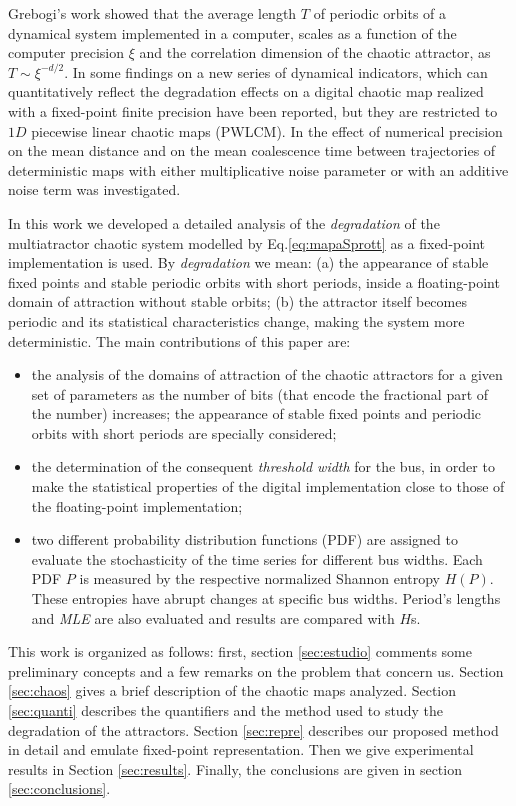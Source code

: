 Grebogi's work \cite{Grebogi1988} showed that the average
length $T$  of periodic orbits of a dynamical system implemented in a computer, scales as a
function of the computer precision $\xi$  and the correlation dimension
 of the chaotic attractor, as $T \sim  \xi^{-d/2}$. In
\cite{SHUJUN2005} some findings on a new series of dynamical
indicators, which can quantitatively reflect the degradation
effects on a digital chaotic map realized with a fixed-point
finite precision have been reported, but they are restricted to $1D$
piecewise linear chaotic maps (PWLCM). In \cite{Dias2011} the effect of numerical precision on the mean
distance and on the mean coalescence time between trajectories of deterministic maps with either multiplicative noise parameter or with an additive noise term was investigated.

In this work we developed a detailed analysis of the
\textsl{degradation} of the multiatractor chaotic system modelled
by Eq.\ref{eq:mapaSprott} as a fixed-point implementation is used. By
\textsl{degradation} we mean: (a) the appearance of stable fixed
points and stable periodic orbits with short periods, inside a
floating-point domain of attraction without stable orbits; (b) the
attractor itself becomes periodic and its statistical
characteristics change, making the system more deterministic. The main contributions of this paper are: 
\begin{itemize}
\item the analysis of the domains of
attraction of the chaotic attractors for a given set of parameters
as the number of bits (that encode the fractional part of the number)
increases; the appearance of stable fixed points and periodic
orbits with short periods are specially considered;
\item the  determination of the consequent \textsl{threshold width} for the bus, in order to make the  statistical
 properties of the digital implementation close to those of the floating-point implementation; 
\item  two different probability distribution functions (PDF) are assigned  to evaluate the stochasticity of the time series for different bus widths. Each PDF  $P$ is measured by the respective normalized Shannon entropy $H(P)$. These entropies have abrupt changes at specific bus widths. Period's lengths and \textsl{MLE} are also evaluated and results are compared with $H$s.
\end{itemize}
This work is organized as follows: first, section \ref{sec:estudio} comments some preliminary concepts and a few remarks on the problem that concern us. Section \ref{sec:chaos} gives a
brief description of the chaotic maps analyzed. Section \ref{sec:quanti} describes the quantifiers and the method used to study the degradation of the attractors. Section \ref{sec:repre} describes our proposed method in detail and emulate fixed-point representation. Then we give experimental results
in Section \ref{sec:results}. Finally, the conclusions are given in section \ref{sec:conclusions}.
